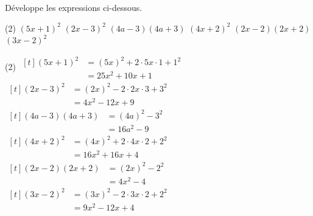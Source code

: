 \documentclass[a4paper,fontsize=12pt, parskip=half]{scrartcl}
\begin{document}
\begin{exercise}
    Développe les expressions ci-dessous.
    \begin{tasks}(2)
        \task $(5x+1)^2$
        \task $(2x-3)^2$
        \task $(4a-3)(4a+3)$
        \task $(4x+2)^2$
        \task $(2x-2)(2x+2)$
        \task $(3x-2)^2$
    \end{tasks}
\end{exercise}
\begin{solution}
    \begin{tasks}(2)
        \task
        $\begin{aligned}[t]
                (5x+1)^2
                 & = (5x)^2 + 2\cdot 5x \cdot 1 + 1^2 \\
                 & = 25x^2 + 10x + 1
            \end{aligned}$
        \task
        $\begin{aligned}[t]
                (2x-3)^2
                 & = (2x)^2 - 2\cdot 2x \cdot 3 + 3^2 \\
                 & = 4x^2 - 12x + 9
            \end{aligned}$
        \task
        $\begin{aligned}[t]
                (4a-3)(4a+3)
                 & = (4a)^2 - 3^2 \\
                 & = 16a^2 - 9
            \end{aligned}$
        \task
        $\begin{aligned}[t]
                (4x+2)^2
                 & = (4x)^2 + 2\cdot 4x \cdot 2 + 2^2 \\
                 & = 16x^2 + 16x + 4
            \end{aligned}$
        \task
        $\begin{aligned}[t]
                (2x-2)(2x+2)
                 & = (2x)^2 - 2^2 \\
                 & = 4x^2 - 4
            \end{aligned}$
        \task
        $\begin{aligned}[t]
                (3x-2)^2
                 & = (3x)^2 - 2\cdot 3x\cdot 2+2^2 \\
                 & = 9x^2 - 12x + 4
            \end{aligned}$
    \end{tasks}
\end{solution}
\end{document}
